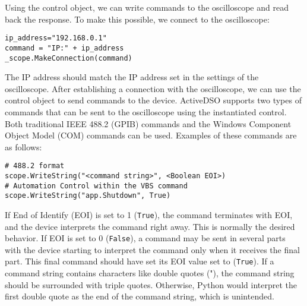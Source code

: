 %
Using the control object, we can write commands to the oscilloscope and read back the response. To make this possible, we connect to the oscilloscope:
%
\begin{verbatim}
ip_address="192.168.0.1"
command = "IP:" + ip_address
_scope.MakeConnection(command)
\end{verbatim}
%
The IP address should match the IP address set in the settings of the oscilloscope.
After establishing a connection with the oscilloscope, we can use the control object to send commands to the device.
ActiveDSO supports two types of commands that can be sent to the oscilloscope using the instantiated control.
Both traditional IEEE 488.2 (GPIB) commands and the Windows\textsuperscript{\textregistered} Component Object Model (COM) commands can be used.
Examples of these commands are as follows:
%
\begin{verbatim}
# 488.2 format
scope.WriteString("<command string>", <Boolean EOI>)
# Automation Control within the VBS command
scope.WriteString("app.Shutdown", True)
\end{verbatim}
%
If End of Identify (EOI) is set to 1 (\texttt{True}), the command terminates with EOI, and the device interprets the command right away. This is normally the desired behavior.
If EOI is set to 0 (\texttt{False}), a command may be sent in several parts with the device starting to interpret the command only when it receives the final part.
This final command should have set its EOI value set to (\texttt{True}).
If a command string contains characters like double quotes ("), the command string should be surrounded with triple quotes.
Otherwise, Python would interpret the first double quote as the end of the command string, which is unintended.


